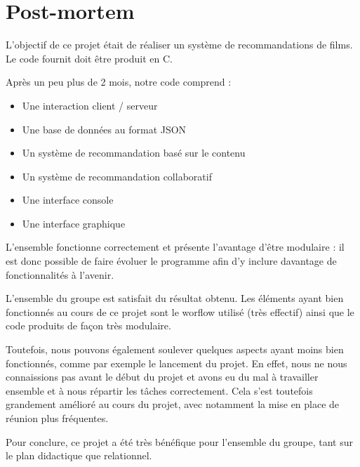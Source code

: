 \section{Post-mortem}
L'objectif de ce projet était de réaliser un système de recommandations de films. Le code fournit doit être produit en C.\par
Après un peu plus de 2 mois, notre code comprend :
\begin{itemize}
	\item Une interaction client / serveur
	\item Une base de données au format JSON
	\item Un système de recommandation basé sur le contenu
	\item Un système de recommandation collaboratif
	\item Une interface console
	\item Une interface graphique
\end{itemize}
\vspace{0.5cm}
L'ensemble fonctionne correctement et présente l'avantage d'être modulaire : il est donc possible de faire évoluer le programme afin d'y inclure davantage de fonctionnalités à l'avenir.\par
L'ensemble du groupe est satisfait du résultat obtenu. Les éléments ayant bien fonctionnés au cours de ce projet sont le worflow utilisé (très effectif) ainsi que le code produits de façon très modulaire.\par
Toutefois, nous pouvons également soulever quelques aspects ayant moins bien fonctionnés, comme par exemple le lancement du projet. En effet, nous ne nous connaissions pas avant le début du projet et avons eu du mal à travailler ensemble et à nous répartir les tâches correctement. Cela s'est toutefois grandement amélioré au cours du projet, avec notamment la mise en place de réunion plus fréquentes.\par
Pour conclure, ce projet a été très bénéfique pour l'ensemble du groupe, tant sur le plan didactique que relationnel.
